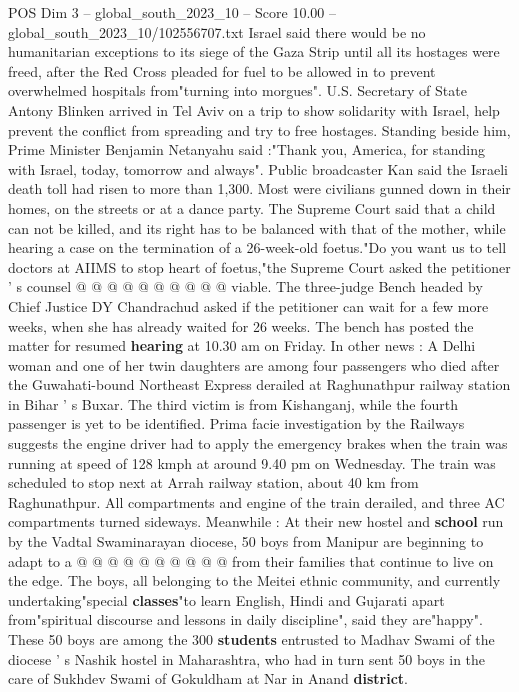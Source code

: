 \begin{textsample}{POS Dim 3 – global\_south\_2023\_10 – Score 10.00 – global\_south\_2023\_10/102556707.txt}  \label{ex:f3_pos_432}
Israel said there would be no humanitarian exceptions to its siege of the Gaza Strip until all its hostages were freed, after the Red Cross pleaded for fuel to be allowed in to prevent overwhelmed hospitals from"turning into morgues".
U.S.
Secretary of State Antony Blinken arrived in Tel Aviv on a trip to show solidarity with Israel, help prevent the conflict from spreading and try to free hostages.
Standing beside him, Prime Minister Benjamin Netanyahu said :"Thank you, America, for standing with Israel, today, tomorrow and always".
Public broadcaster Kan said the Israeli death toll had risen to more than 1,300.
Most were civilians gunned down in their homes, on the streets or at a dance party.
The Supreme Court said that a child can not be killed, and its right has to be balanced with that of the mother, while hearing a case on the termination of a 26-week-old foetus."Do you want us to tell doctors at AIIMS to stop heart of foetus,"the Supreme Court asked the petitioner ' s counsel @ @ @ @ @ @ @ @ @ @ viable.
The three-judge Bench headed by Chief Justice DY Chandrachud asked if the petitioner can wait for a few more weeks, when she has already waited for 26 weeks.
The bench has posted the matter for resumed \textbf{hearing} at 10.30 am on Friday.
In other news : A Delhi woman and one of her twin daughters are among four passengers who died after the Guwahati-bound Northeast Express derailed at Raghunathpur railway station in Bihar ' s Buxar.
The third victim is from Kishanganj, while the fourth passenger is yet to be identified.
Prima facie investigation by the Railways suggests the engine driver had to apply the emergency brakes when the train was running at speed of 128 kmph at around 9.40 pm on Wednesday.
The train was scheduled to stop next at Arrah railway station, about 40 km from Raghunathpur.
All compartments and engine of the train derailed, and three AC compartments turned sideways.
Meanwhile : At their new hostel and \textbf{school} run by the Vadtal Swaminarayan diocese, 50 boys from Manipur are beginning to adapt to a @ @ @ @ @ @ @ @ @ @ from their families that continue to live on the edge.
The boys, all belonging to the Meitei ethnic community, and currently undertaking"special \textbf{classes}"to learn English, Hindi and Gujarati apart from"spiritual discourse and lessons in daily discipline", said they are"happy".
These 50 boys are among the 300 \textbf{students} entrusted to Madhav Swami of the diocese ' s Nashik hostel in Maharashtra, who had in turn sent 50 boys in the care of Sukhdev Swami of Gokuldham at Nar in Anand \textbf{district}.

\end{textsample}
